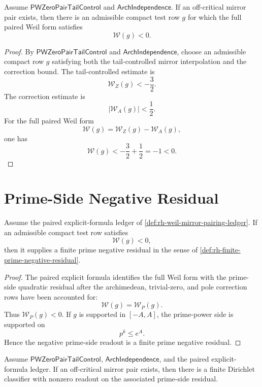 \begin{theorem}[NegativeWeilIsolator]
\label{thm:rh-negative-weil-isolator}
Assume $\mathsf{PWZeroPairTailControl}$ and
$\mathsf{ArchIndependence}$.  If an off-critical mirror pair exists,
then there is an admissible compact test row $g$ for which the full
paired Weil form satisfies
$$
\mathcal W(g)<0.
$$
\end{theorem}

\begin{proof}
By $\mathsf{PWZeroPairTailControl}$ and $\mathsf{ArchIndependence}$,
choose an admissible compact row $g$ satisfying both the tail-controlled
mirror interpolation and the correction bound.  The tail-controlled
estimate is
$$
\mathcal W_Z(g)<-\frac32.
$$
The correction estimate is
$$
|\mathcal W_A(g)|<\frac12.
$$
For the full paired Weil form
$$
\mathcal W(g)=\mathcal W_Z(g)-\mathcal W_A(g),
$$
one has
$$
\mathcal W(g)
<
-\frac32+\frac12
=
-1
<
0.
$$
\end{proof}

\section{Prime-Side Negative Residual}
\label{sec:rh-negative-weil-prime-side-residual}

\begin{theorem}
\label{thm:rh-negative-weil-direction-gives-finite-prime-negative-residual}
Assume the paired explicit-formula ledger of
\autoref{def:rh-weil-mirror-pairing-ledger}.  If an admissible compact
test row satisfies
$$
\mathcal W(g)<0,
$$
then it supplies a finite prime negative residual in the sense of
\autoref{def:rh-finite-prime-negative-residual}.
\end{theorem}

\begin{proof}
The paired explicit formula identifies the full Weil form with the
prime-side quadratic residual after the archimedean, trivial-zero, and
pole correction rows have been accounted for:
$$
\mathcal W(g)=\mathcal W_P(g).
$$
Thus $\mathcal W_P(g)<0$.  If $g$ is supported in $[-A,A]$, the
prime-power side is supported on
$$
p^k\le e^A.
$$
Hence the negative prime-side readout is a finite prime negative
residual.
\end{proof}

\begin{corollary}
\label{cor:rh-negative-isolator-gives-classifier-visible-residual}
Assume $\mathsf{PWZeroPairTailControl}$,
$\mathsf{ArchIndependence}$, and the paired explicit-formula ledger.  If
an off-critical mirror pair exists, then there is a finite Dirichlet
classifier with nonzero readout on the associated prime-side residual.
\end{corollary}

